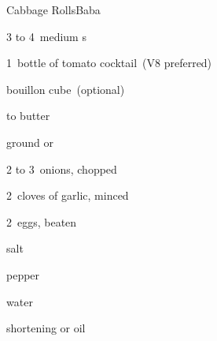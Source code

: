 \begin{recipe}{Cabbage Rolls}{Baba}{}

\begin{ingredients}
\item 3 to 4~medium s
\item 1~bottle of tomato cocktail~(V8 preferred)
\item {} 
\item bouillon cube~(optional)
\item \lbs{\quarter} to \lbs{\half} butter
\item {} ground  or 
\item 2 to 3~onions, chopped
\item 2~cloves of garlic, minced
\item 2~eggs, beaten
\item salt
\item pepper
\item {} water
\item shortening or oil
\end{ingredients}


\end{recipe}
